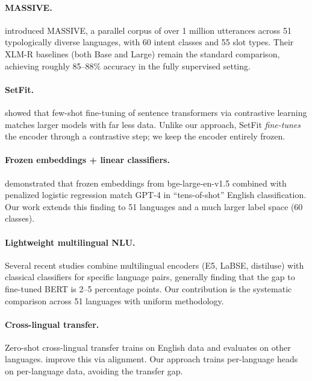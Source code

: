 \documentclass[11pt]{article}
\begin{document}
\paragraph{MASSIVE.} \citet{fitzgerald2023massive} introduced MASSIVE, a parallel corpus of over 1 million utterances across 51 typologically diverse languages, with 60 intent classes and 55 slot types. Their XLM-R baselines (both Base and Large) remain the standard comparison, achieving roughly 85--88\% accuracy in the fully supervised setting.

\paragraph{SetFit.} \citet{tunstall2022setfit} showed that few-shot fine-tuning of sentence transformers via contrastive learning matches larger models with far less data. Unlike our approach, SetFit \textit{fine-tunes} the encoder through a contrastive step; we keep the encoder entirely frozen.

\paragraph{Frozen embeddings + linear classifiers.} \citet{buckmann2024logistic} demonstrated that frozen embeddings from bge-large-en-v1.5 combined with penalized logistic regression match GPT-4 in ``tens-of-shot'' English classification. Our work extends this finding to 51 languages and a much larger label space (60 classes).

\paragraph{Lightweight multilingual NLU.} Several recent studies combine multilingual encoders (E5, LaBSE, distiluse) with classical classifiers for specific language pairs, generally finding that the gap to fine-tuned BERT is 2--5 percentage points. Our contribution is the systematic comparison across 51 languages with uniform methodology.

\paragraph{Cross-lingual transfer.} Zero-shot cross-lingual transfer \citep{hu2020xtreme, conneau2020xlmr} trains on English data and evaluates on other languages. \citet{gritta2021xeroalign} improve this via alignment. Our approach trains per-language heads on per-language data, avoiding the transfer gap.
\end{document}
